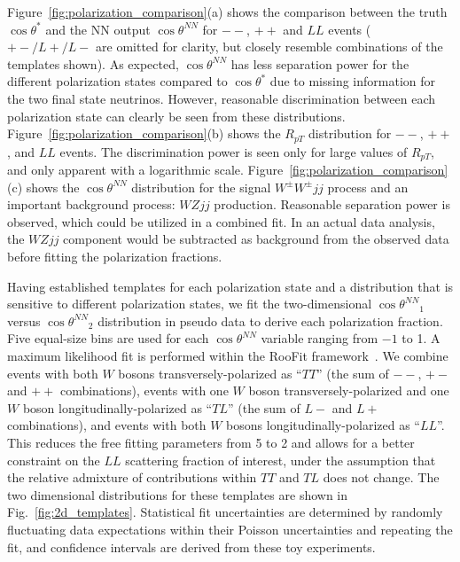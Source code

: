 \documentclass[aps,prl,twocolumn,showpacs,superscriptaddress,groupeaddress,floatfix]{revtex4}
\def\ssWW{\ensuremath{ W^{\pm}W^{\pm}jj }\xspace}
\def\ts{\ensuremath{ \theta^{*} }\xspace}
\def\tsNN{\ensuremath{ \theta^{NN} }\xspace}
\def\cts{\ensuremath{ \cos\ts }\xspace}
\def\ctsNN{\ensuremath{ \cos\tsNN }\xspace}
\begin{document}
Figure~\ref{fig:polarization_comparison}(a) shows the comparison between the truth \cts and 
the NN output \ctsNN for $--$, $++$ and $LL$ events ( $+-/L+/L-$ are omitted for clarity, but closely resemble combinations of the templates shown). As expected, \ctsNN has less separation 
power for the different polarization states compared to \cts due to missing information for the two final state neutrinos. 
However, reasonable discrimination between each polarization state can clearly be seen from these distributions. 
Figure~\ref{fig:polarization_comparison}(b) shows the $R_{pT}$ distribution for $--$, $++$, and $LL$ events. 
The discrimination power is seen only for large values of $R_{pT}$, and only apparent with a logarithmic scale. Figure~\ref{fig:polarization_comparison}(c) shows the \ctsNN distribution for the signal \ssWW process and an important background process: $WZjj$ production.  Reasonable separation power is observed, which could be utilized in a combined fit. In an actual data analysis, the $WZjj$ component would be subtracted as background
from the observed data before fitting the polarization fractions.

Having established templates for each polarization state and a
distribution that is sensitive to different polarization states, 
we fit the two-dimensional $\ctsNN_1$ versus $\ctsNN_2$
distribution in pseudo data to derive each polarization fraction. Five equal-size bins 
are used for each \ctsNN variable ranging from $-1$ to 1. A maximum likelihood fit is performed 
within the RooFit framework~\cite{RooFit}. We combine events with both $W$ bosons transversely-polarized as
``$TT$'' (the sum of $--$, $+-$ and $++$ combinations), events with
one $W$ boson transversely-polarized and one $W$ boson
longitudinally-polarized as ``$TL$'' (the sum of $L-$ and $L+$
combinations), and events with both $W$ bosons
longitudinally-polarized as ``$LL$''. This reduces the free fitting parameters from 5 to 2 and 
allows for a better constraint on the $LL$ scattering fraction of interest, under the assumption that
the relative admixture of contributions within $TT$ and $TL$ does not change. The two dimensional distributions for these templates are shown in Fig.~\ref{fig:2d_templates}. Statistical fit uncertainties are determined by randomly
fluctuating data expectations within their Poisson uncertainties and
repeating the fit, and confidence intervals are derived from these toy experiments.  
\end{document}
